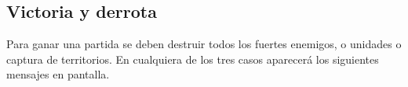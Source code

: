     \def\path{DisparoEdificio.png}
    \def\scale{.6}
    \def\text{Disparo a edificio}
    
\subsection{Victoria y derrota}
    Para ganar una partida se deben destruir todos los fuertes enemigos, o
    unidades o captura de territorios. En cualquiera de los tres casos aparecerá los
    siguientes mensajes en pantalla.
    \def\path{Ganaste.png}
    \def\scale{.6}
    \def\text{Ganaste}
    

    \def\path{Perdiste.png}
    \def\scale{.6}
    \def\text{Perdiste}
    